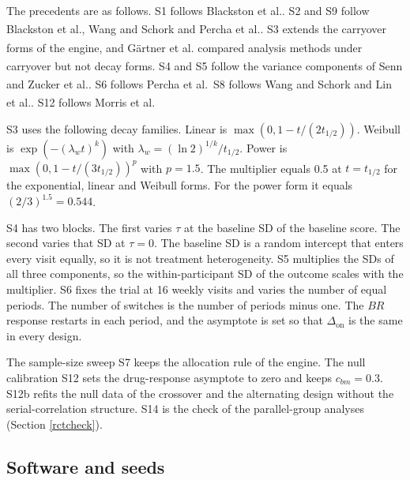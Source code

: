 \documentclass[
  11pt,
]{article}
\begin{document}
The precedents are as follows. S1 follows Blackston et al.\textsuperscript{}. S2 and S9 follow Blackston et al., Wang and Schork\textsuperscript{} and Percha et al.\textsuperscript{}. S3 extends the carryover forms of the engine, and Gärtner et al.\textsuperscript{} compared analysis methods under carryover but not decay forms. S4 and S5 follow the variance components of Senn\textsuperscript{} and Zucker et al.\textsuperscript{}. S6 follows Percha et al.~S8 follows Wang and Schork and Lin et al.\textsuperscript{}. S12 follows Morris et al.

S3 uses the following decay families. Linear is \(\max(0, 1 - t/(2t_{1/2}))\). Weibull is \(\exp(-(\lambda_w t)^k)\) with \(\lambda_w = (\ln 2)^{1/k}/t_{1/2}\). Power is \(\max(0, 1 - t/(3t_{1/2}))^p\) with \(p = 1.5\). The multiplier equals 0.5 at \(t = t_{1/2}\) for the exponential, linear and Weibull forms. For the power form it equals \((2/3)^{1.5} = 0.544\).

S4 has two blocks. The first varies \(\tau\) at the baseline SD of the baseline score. The second varies that SD at \(\tau = 0\). The baseline SD is a random intercept that enters every visit equally, so it is not treatment heterogeneity. S5 multiplies the SDs of all three components, so the within-participant SD of the outcome scales with the multiplier. S6 fixes the trial at 16 weekly visits and varies the number of equal periods. The number of switches is the number of periods minus one. The \(BR\) response restarts in each period, and the asymptote is set so that \(\Delta_{\mathrm{on}}\) is the same in every design.

The sample-size sweep S7 keeps the allocation rule of the engine. The null calibration S12 sets the drug-response asymptote to zero and keeps \(c_{bm} = 0.3\). S12b refits the null data of the crossover and the alternating design without the serial-correlation structure. S14 is the check of the parallel-group analyses (Section \ref{rctcheck}).

\subsection{Software and seeds}\label{software-and-seeds}
\end{document}
